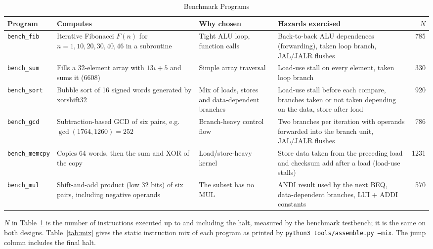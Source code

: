 \begin{table}[!t]
\centering
\caption{Benchmark Programs}
\label{tab:bench}
\setlength{\tabcolsep}{4pt}
\renewcommand{\arraystretch}{1.1}
\begin{tabular}{@{}lp{5.2cm}p{4.0cm}p{5.4cm}r@{}}
\toprule
\textbf{Program} & \textbf{Computes} & \textbf{Why chosen} & \textbf{Hazards exercised} & \textbf{$N$} \\ \midrule
\texttt{bench\_fib}    & Iterative Fibonacci $F(n)$ for $n = 1, 10, 20, 30, 40, 46$ in a subroutine &
  Tight ALU loop, function calls & Back-to-back ALU dependences (forwarding), taken loop branch, JAL/JALR flushes & 785 \\
\texttt{bench\_sum}    & Fills a 32-element array with $13i+5$ and sums it (6608) &
  Simple array traversal & Load-use stall on every element, taken loop branch & 330 \\
\texttt{bench\_sort}   & Bubble sort of 16 signed words generated by xorshift32 &
  Mix of loads, stores and data-dependent branches & Load-use stall before each compare, branches taken or not taken depending on the data, store after load & 920 \\
\texttt{bench\_gcd}    & Subtraction-based GCD of six pairs, e.g.\ $\gcd(1764,1260)=252$ &
  Branch-heavy control flow & Two branches per iteration with operands forwarded into the branch unit, JAL/JALR flushes & 786 \\
\texttt{bench\_memcpy} & Copies 64 words, then the sum and XOR of the copy &
  Load/store-heavy kernel & Store data taken from the preceding load and checksum add after a load (load-use stalls) & 1231 \\
\texttt{bench\_mul}    & Shift-and-add product (low 32 bits) of six pairs, including negative operands &
  The subset has no MUL & ANDI result used by the next BEQ, data-dependent branches, LUI + ADDI constants & 570 \\
\bottomrule
\end{tabular}
\end{table}

$N$ in Table~\ref{tab:bench} is the number of instructions executed up to and
including the halt, measured by the benchmark testbench; it is the same on both
designs. Table~\ref{tab:mix} gives the static instruction mix of each program
as printed by \texttt{python3 tools/assemble.py --mix}. The jump column includes
the final halt.

